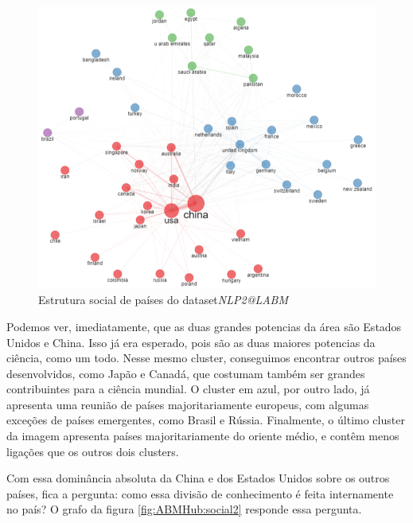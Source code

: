 \begin{figure}
    \centering
    \includegraphics[width=1\textwidth]{experiments/ABMHub/PesquisaBibliometrica/NLP/socialStructure.png}
    \caption{Estrutura social de países do dataset\textit{NLP2@LABM}}
    \label{fig:ABMHub:social}
\end{figure}

Podemos ver, imediatamente, que as duas grandes potencias da área são Estados Unidos e China. Isso já era esperado, pois são as duas maiores potencias da ciência, como um todo. Nesse mesmo cluster, conseguimos encontrar outros países desenvolvidos, como Japão e Canadá, que costumam também ser grandes contribuintes para a ciência mundial. O cluster em azul, por outro lado, já apresenta uma reunião de países majoritariamente europeus, com algumas exceções de países emergentes, como Brasil e Rússia. Finalmente, o último cluster da imagem apresenta países majoritariamente do oriente médio, e contêm menos ligações que os outros dois clusters.

Com essa dominância absoluta da China e dos Estados Unidos sobre os outros países, fica a pergunta: como essa divisão de conhecimento é feita internamente no país? O grafo da figura \ref{fig:ABMHub:social2} responde essa pergunta.

